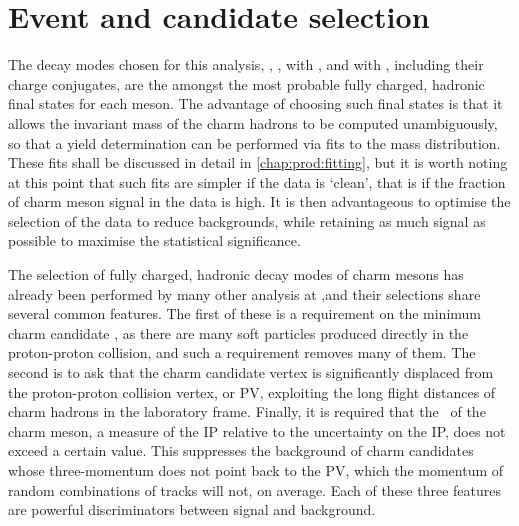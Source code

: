 \chapter{Event and candidate selection}
\label{chap:prod:sel}

The decay modes chosen for this analysis,
\DzToKpi, \DpToKpipi, \DspTophipi with \phiToKK, and \DstToDzpi with \DzToKpi, 
including their charge conjugates, are the amongst the most probable fully 
charged, hadronic final states for each meson.
The advantage of choosing such final states is that it allows the invariant 
mass of the charm hadrons to be computed unambiguously, so that a yield 
determination can be performed via fits to the mass distribution.
These fits shall be discussed in detail in \cref{chap:prod:fitting}, but it is 
worth noting at this point that such fits are simpler if the data is `clean', 
that is if the fraction of charm meson signal in the data is high.
It is then advantageous to optimise the selection of the data to reduce 
backgrounds, while retaining as much signal as possible to maximise the 
statistical significance.

The selection of fully charged, hadronic decay modes of charm mesons has 
already been performed by many other analysis at \lhcb,\footnotemark and their 
selections share several common features.
The first of these is a requirement on the minimum charm candidate \pT, as 
there are many soft particles produced directly in the proton-proton collision, 
and such a requirement removes many of them.
The second is to ask that the charm candidate vertex is significantly displaced 
from the proton-proton collision vertex, or \ac{PV}, exploiting the long flight 
distances of charm hadrons in the laboratory frame.
Finally, it is required that the \ipchisq\ of the charm meson, a measure of the 
\acf{IP} relative to the uncertainty on the \ac{IP}, does not exceed a certain 
value.
This suppresses the background of charm candidates whose three-momentum does 
not point back to the \ac{PV}, which the momentum of random combinations of 
tracks will not, on average.
Each of these three features are powerful discriminators between signal and 
background.


